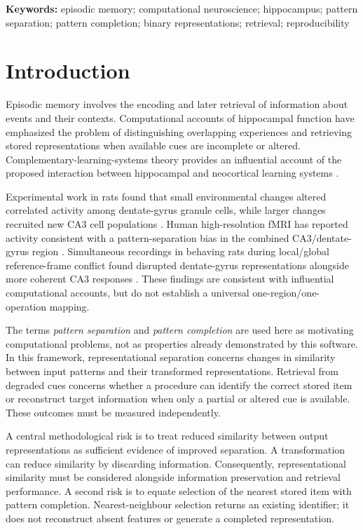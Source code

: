 \documentclass[11pt,a4paper]{article}
\begin{document}
\noindent\textbf{Keywords:} episodic memory; computational neuroscience; hippocampus; pattern separation; pattern completion; binary representations; retrieval; reproducibility

\section{Introduction}

Episodic memory involves the encoding and later retrieval of information about events and their contexts. Computational accounts of hippocampal function have emphasized the problem of distinguishing overlapping experiences and retrieving stored representations when available cues are incomplete or altered. Complementary-learning-systems theory provides an influential account of the proposed interaction between hippocampal and neocortical learning systems \citep{mcclelland1995}.

Experimental work in rats found that small environmental changes altered correlated activity among dentate-gyrus granule cells, while larger changes recruited new CA3 cell populations \citep{leutgeb2007}. Human high-resolution fMRI has reported activity consistent with a pattern-separation bias in the combined CA3/dentate-gyrus region \citep{bakker2008}. Simultaneous recordings in behaving rats during local/global reference-frame conflict found disrupted dentate-gyrus representations alongside more coherent CA3 responses \citep{neunuebel2014}. These findings are consistent with influential computational accounts, but do not establish a universal one-region/one-operation mapping.

The terms \emph{pattern separation} and \emph{pattern completion} are used here as motivating computational problems, not as properties already demonstrated by this software. In this framework, representational separation concerns changes in similarity between input patterns and their transformed representations. Retrieval from degraded cues concerns whether a procedure can identify the correct stored item or reconstruct target information when only a partial or altered cue is available. These outcomes must be measured independently.

A central methodological risk is to treat reduced similarity between output representations as sufficient evidence of improved separation. A transformation can reduce similarity by discarding information. Consequently, representational similarity must be considered alongside information preservation and retrieval performance. A second risk is to equate selection of the nearest stored item with pattern completion. Nearest-neighbour selection returns an existing identifier; it does not reconstruct absent features or generate a completed representation.
\end{document}
